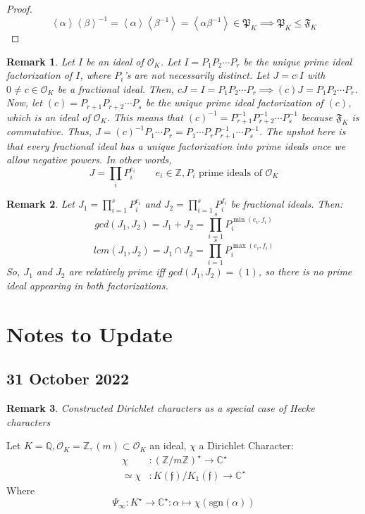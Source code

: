 \documentclass{article}
\newcommand{\C}{\mathbb{C}}
\newcommand{\la}{\left\langle}
\newcommand{\ra}{\right\rangle}
\newcommand{\air}{\mathcal{O}_K}
\newcommand{\Q}{\mathbb{Q}}
\newcommand{\Z}{\mathbb{Z}}
\newtheorem{remark}{Remark}[subsection]
\begin{document}
\begin{proof}
$$\la\alpha\ra \la\beta\ra^{-1}=\la\alpha\ra\la\beta^{-1}\ra = \la \alpha\beta^{-1}\ra\in\mathfrak{P}_K\implies \mathfrak{P}_K\leq \mathfrak{F}_K$$
\end{proof}
\begin{remark}
Let $I$ be an ideal of $\air$. Let $I=P_1P_2\cdots P_r$ be the unique prime ideal factorization of $I$, where $P_i$'s are not necessarily distinct. Let $J=c^{_1}I$ with $0\neq c\in\air$ be a fractional ideal. Then, $cJ=I=P_1P_2\cdots P_r\implies (c)J=P_1P_2\cdots P_r$. Now, let $(c)=P_{r+1}P_{r+2}\cdots P_s$ be the unique prime ideal factorization of $(c)$, which is an ideal of $\air$. This means that $(c)^{-1}=P_{r+1}^{-1}P_{r+2}^{-1}\cdots P_s^{-1}$ because $\mathfrak{F}_K$ is commutative. Thus, $J=(c)^{-1}P_1\cdots P_r = P_1\cdots P_rP_{r+1}^{-1}\cdots P_s^{-1}$. The upshot here is that every fractional ideal has a unique factorization into prime ideals once we allow negative powers. In other words,
$$J=\prod_{i}P_i^{e_i}\qquad e_i\in\Z,P_i\text{ prime ideals of }\air$$
\end{remark}
\begin{remark}
Let $J_1=\prod_{i=1}^s P_i^{e_i}$ and $J_2=\prod_{i=1}^s P_i^{f_i}$ be fractional ideals. Then:
$$gcd(J_1,J_2)=J_1+J_2=\prod_{i=1}^sP_i^{\min{(e_i,f_i)}}$$
$$lcm(J_1,J_2)=J_1\cap J_2=\prod_{i=1}^sP_i^{\max{(e_i,f_i)}}$$
So, $J_1$ and $J_2$ are relatively prime iff $gcd(J_1,J_2)=(1)$, so there is no prime ideal appearing in both factorizations.
\end{remark}

\section{Notes to Update}
\subsection{31 October 2022}
\begin{remark}
	Constructed Dirichlet characters as a special case of Hecke characters
\end{remark}
Let $K=\Q, \air=\Z, (m)\subset\air$ an ideal, $\chi$ a Dirichlet Character:
\begin{align*}
\chi&: (\Z/{m\Z})^\star\to\C^\star\\
\simeq\chi&: K(\mathfrak{f})/{K_1(\mathfrak{f})}\to\C^\star
\end{align*}
Where 
$$\Psi_\infty : K^\star\to\C^\star: \alpha\mapsto\chi(\text{sgn}(\alpha))$$
\end{document}
